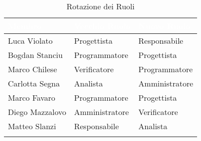\begin{center}
	\begin{longtable}[c]{|m{}|m{}|m{}|} 
		\hline
		\rowcolor{bluelogo}\textbf{\textcolor{white}{Membro}} & \textbf{\textcolor{white}{Vecchio Ruolo}} & \textbf{\textcolor{white}{Nuovo Ruolo}}\\
		\hline
		\hline
		Luca Violato & Progettista & Responsabile \\
		\hline
		\rowcolor{grigio}Bogdan Stanciu & Programmatore & Progettista \\
		\hline
		Marco Chilese & Verificatore & Programmatore	\\
		\hline
		\rowcolor{grigio}Carlotta Segna & Analista & Amministratore\\
		\hline
		Marco Favaro & Programmatore & Progettista \\
		\hline
		\rowcolor{grigio} Diego Mazzalovo & Amministratore & Verificatore\\
		\hline
		Matteo Slanzi & Responsabile & Analista\\
		\hline
		\caption{Rotazione dei Ruoli}
	\end{longtable}
	
\end{center}
